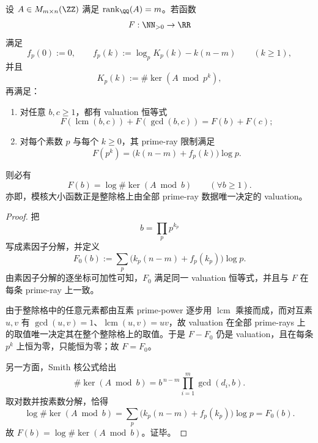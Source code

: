 \begin{theorem}\label{thm:conclusion-smith-divisibility-valuation-primeray-assembly}
设 \(A\in M_{m\times n}(\ZZ)\) 满足 \(\operatorname{rank}_{\QQ}(A)=m\)。若函数
\[
F:\NN_{>0}\to\RR
\]
满足
\[
f_p(0):=0,
\qquad
f_p(k):=\log_p K_p(k)-k(n-m)
\qquad(k\ge 1),
\]
并且
\[
K_p(k):=\#\ker(A\bmod p^k),
\]
再满足：
\begin{enumerate}
  \item 对任意 \(b,c\ge 1\)，都有 valuation 恒等式
  \[
  F(\operatorname{lcm}(b,c))+F(\gcd(b,c))=F(b)+F(c);
  \]
  \item 对每个素数 \(p\) 与每个 \(k\ge 0\)，其 prime-ray 限制满足
  \[
  F(p^k)=\bigl(k(n-m)+f_p(k)\bigr)\log p.
  \]
\end{enumerate}
则必有
\[
F(b)=\log \#\ker(A\bmod b)
\qquad(\forall b\ge 1).
\]
亦即，模核大小函数正是整除格上由全部 prime-ray 数据唯一决定的 valuation。
\end{theorem}
\begin{proof}
把
\[
b=\prod_{p}p^{k_p}
\]
写成素因子分解，并定义
\[
F_0(b):=\sum_{p}\bigl(k_p(n-m)+f_p(k_p)\bigr)\log p.
\]
由素因子分解的逐坐标可加性可知，\(F_0\) 满足同一 valuation 恒等式，并且与 \(F\) 在每条 prime-ray 上一致。

由于整除格中的任意元素都由互素 prime-power 逐步用 \(\operatorname{lcm}\) 乘接而成，而对互素 \(u,v\) 有 \(\gcd(u,v)=1\)、\(\operatorname{lcm}(u,v)=uv\)，故 valuation 在全部 prime-rays 上的取值唯一决定其在整个整除格上的取值。于是 \(F-F_0\) 仍是 valuation，且在每条 \(p^k\) 上恒为零，只能恒为零；故 \(F=F_0\)。

另一方面，Smith 核公式给出
\[
\#\ker(A\bmod b)
=
b^{\,n-m}\prod_{i=1}^{m}\gcd(d_i,b).
\]
取对数并按素数分解，恰得
\[
\log \#\ker(A\bmod b)
=
\sum_{p}\bigl(k_p(n-m)+f_p(k_p)\bigr)\log p
=
F_0(b).
\]
故 \(F(b)=\log \#\ker(A\bmod b)\)。证毕。
\end{proof}

